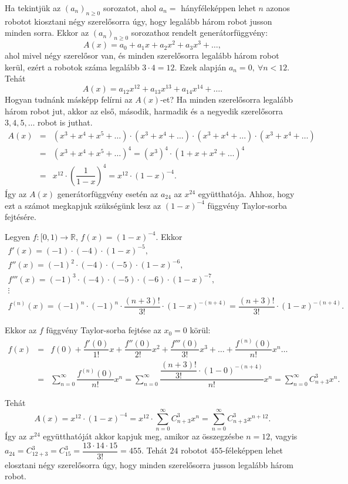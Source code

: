 \begin{solution}
Ha tekintjük az $(a_{n})_{n\geq0}$ sorozatot, ahol $a_{n}=$ hányféleképpen
lehet $n$ azonos robotot kiosztani négy szerelősorra úgy, hogy legalább
három robot jusson minden sorra. Ekkor az $(a_{n})_{n\geq0}$ sorozathoz
rendelt generátorfüggvény: 
\[
A(x)=a_{0}+a_{1}x+a_{2}x^{2}+a_{3}x^{3}+\ldots,
\]
ahol mivel négy szerelősor van, és minden szerelősorra legalább három
robot kerül, ezért a robotok száma legalább $3\cdot4=12$. Ezek alapján
$a_{n}=0,\ \forall n<12$. Tehát 
\[
A(x)=a_{12}x^{12}+a_{13}x^{13}+a_{14}x^{14}+\ldots.
\]
Hogyan tudnánk másképp felírni az $A(x)$-et? Ha minden szerelősorra
legalább három robot jut, akkor az első, második, harmadik és a negyedik
szerelősorra $3,4,5,\ldots$ robot is juthat. 
\[
\begin{array}{lcl}
A(x) & = & (x^{3}+x^{4}+x^{5}+\ldots)\cdot(x^{3}+x^{4}+\ldots)\cdot(x^{3}+x^{4}+\ldots)\cdot(x^{3}+x^{4}+\ldots)\\
 & = & (x^{3}+x^{4}+x^{5}+\ldots)^{4}=(x^{3})^{4}\cdot(1+x+x^{2}+\ldots)^{4}\\
 & = & x^{12}\cdot\left(\dfrac{1}{1-x}\right)^{4}=x^{12}\cdot(1-x)^{-4}.
\end{array}
\]
Így az $A(x)$ generátorfüggvény esetén az $a_{24}$ az $x^{24}$
együtthatója. Ahhoz, hogy ezt a számot megkapjuk szükségünk lesz az
$(1-x)^{-4}$ függvény Taylor-sorba fejtésére.

Legyen $f:[0,1)\rightarrow\mathbb{R}$, $f(x)=(1-x)^{-4}$. Ekkor
\[
\begin{array}{l}
f'(x)=(-1)\cdot(-4)\cdot(1-x)^{-5},\\
f''(x)=(-1)^{2}\cdot(-4)\cdot(-5)\cdot(1-x)^{-6},\\
f'''(x)=(-1)^{3}\cdot(-4)\cdot(-5)\cdot(-6)\cdot(1-x)^{-7},\\
\vdots\\
f^{(n)}(x)=(-1)^{n}\cdot(-1)^{n}\cdot\dfrac{(n+3)!}{3!}\cdot(1-x)^{-(n+4)}=\dfrac{(n+3)!}{3!}\cdot(1-x)^{-(n+4)}.
\end{array}
\]

Ekkor az $f$ függvény Taylor-sorba fejtése az $x_{0}=0$ körül: 
\[
\begin{array}{lcl}
f(x) & = & f(0)+\dfrac{f'(0)}{1!}x+\dfrac{f''(0)}{2!}x^{2}+\dfrac{f'''(0)}{3!}x^{3}+\ldots+\dfrac{f^{(n)}(0)}{n!}x^{n}\ldots\\
 & = & {\displaystyle {\sum_{n=0}^{\infty}}\dfrac{f^{(n)}(0)}{n!}x^{n}={\displaystyle {\sum_{n=0}^{\infty}}\dfrac{\dfrac{(n+3)!}{3!}\cdot(1-0)^{-(n+4)}}{n!}x^{n}={\displaystyle {\sum_{n=0}^{\infty}}C_{n+3}^{3}x^{n}.}}}
\end{array}
\]

Tehát 
\[
A(x)=x^{12}\cdot(1-x)^{-4}=x^{12}\cdot{\displaystyle {\sum_{n=0}^{\infty}}C_{n+3}^{3}x^{n}={\displaystyle {\sum_{n=0}^{\infty}}C_{n+3}^{3}x^{n+12}.}}
\]
Így az $x^{24}$ együtthatóját akkor kapjuk meg, amikor az összegzésbe
$n=12$, vagyis $a_{24}=C_{12+3}^{3}=C_{15}^{3}=\dfrac{13\cdot14\cdot15}{3!}=455$.
Tehát $24$ robotot $455$-féleképpen lehet elosztani négy szerelősorra
úgy, hogy minden szerelősorra jusson legalább három robot. 
\end{solution}

